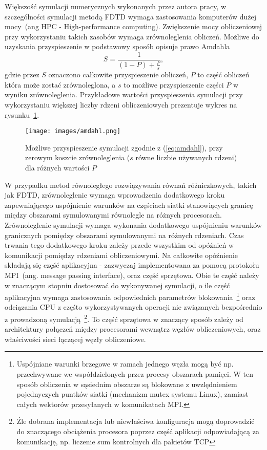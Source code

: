 
Większość symulacji numerycznych wykonanych przez autora pracy, w szczególności symulacji metodą FDTD wymaga zastosowania komputerów dużej mocy~(ang HPC - High-performance computing). Zwiększenie mocy obliczeniowej przy wykorzystaniu takich zasobów wymaga zrównoleglenia obliczeń. Możliwe do uzyskania przyspieszenie w podstawowy sposób opisuje prawo Amdahla
\begin{equation}
	S=\frac{1}{(1-P)+\frac{P}{s}},
	\label{eq:amdahl}
\end{equation}
gdzie przez $S$ oznaczono całkowite przyspieszenie obliczeń, $P$ to część obliczeń która może zostać zrównoleglona, a $s$ to możliwe przyspieszenie części $P$ w wyniku zrównoleglenia. Przykładowe wartości przyspieszenia symulacji przy wykorzystaniu większej liczby rdzeni obliczeniowych prezentuje wykres na rysunku~\ref{fig:amdhal}.

\begin{figure}[h]
	\texttt{[image: images/amdahl.png]}
	\caption{Możliwe przyspieszenie symulacji zgodnie z (\ref{eq:amdahl}), przy zerowym koszcie zrównoleglenia ($s$ równe liczbie używanych rdzeni) dla różnych wartości $P$~\cite{wiki:amdhal}}
	\label{fig:amdhal}
\end{figure}

W przypadku metod równoległego rozwiązywania równań różniczkowych, takich jak FDTD, zrównoleglenie wymaga wprowadzenia dodatkowego kroku zapewniającego uspójnienie warunków na częściach siatki stanowiących granicę między obszarami symulowanymi równolegle na różnych procesorach. Zrównoleglenie symulacji wymaga wykonania dodatkowego uspójnieniu warunków granicznych pomiędzy obszarami symulowanymi na różnych rdzeniach. Czas trwania tego dodatkowego kroku zależy przede wszystkim od opóźnień w komunikacji pomiędzy rdzeniami obliczeniowymi. Na całkowite opóźnienie składają się część aplikacyjna - zazwyczaj implementowana za pomocą protokołu MPI~(ang. message passing interface), oraz część sprzętowa. Obie te część należy w znaczącym stopniu dostosować do wykonywanej symulacji, o ile część aplikacyjna wymaga zastosowania odpowiednich parametrów blokowania~\footnote{Uspójniane warunki brzegowe w ramach jednego węzła mogą być np. przechwywane we współdzielonych przez procesy obszarach pamięci. W ten sposób obliczenia w sąsiednim obszarze są blokowane z uwzlędnieniem pojednyczych puntków siatki (mechanizm mutex systemu Linux), zamiast całych wektorów przesyłanych w komunikatach MPI.} oraz odciązania CPU z częśto wykorzystywanych operacji nie związanych bezpośrednio z prowadzoną symulacją~\footnote{Źle dobrana implementacja lub niewłaściwa konfiguracja mogą doprowadzić do znaczącego obciążenia procesora poprzez część aplikacji odpowiadającą za komunikację, np. liczenie sum kontrolnych dla pakietów TCP}. To część sprzętowa w znaczący sposób zależy od architektury połączeń między procesorami wewnątrz węzłów obliczeniowych, oraz właściwości sieci łączącej węzły obliczeniowe. 

